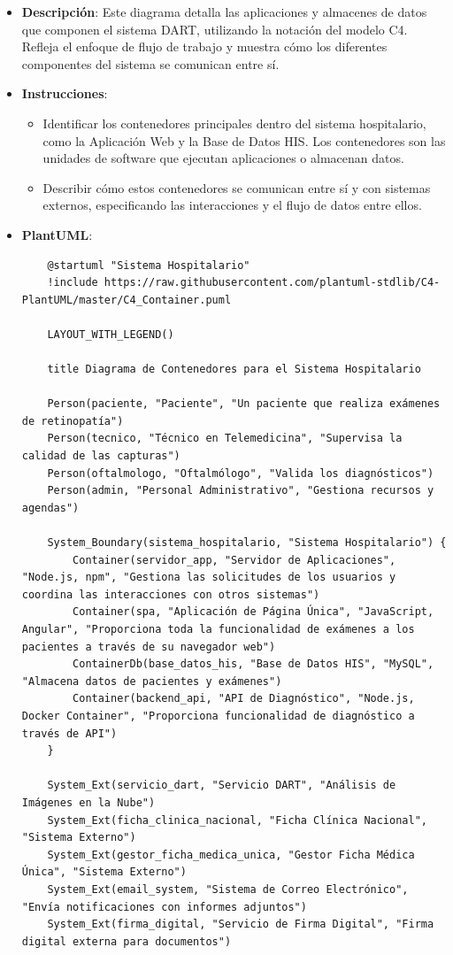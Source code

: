 \begin{itemize}
    \item \textbf{Descripción}: Este diagrama detalla las aplicaciones y almacenes de datos que componen el sistema DART, utilizando la notación del modelo C4. Refleja el enfoque de flujo de trabajo y muestra cómo los diferentes componentes del sistema se comunican entre sí.
    \item \textbf{Instrucciones}:
    \begin{itemize}
        \item Identificar los contenedores principales dentro del sistema hospitalario, como la Aplicación Web y la Base de Datos HIS. Los contenedores son las unidades de software que ejecutan aplicaciones o almacenan datos.
        \item Describir cómo estos contenedores se comunican entre sí y con sistemas externos, especificando las interacciones y el flujo de datos entre ellos.
    \end{itemize}
    \item \textbf{PlantUML}:
    \begin{verbatim}
    @startuml "Sistema Hospitalario"
    !include https://raw.githubusercontent.com/plantuml-stdlib/C4-PlantUML/master/C4_Container.puml

    LAYOUT_WITH_LEGEND()

    title Diagrama de Contenedores para el Sistema Hospitalario

    Person(paciente, "Paciente", "Un paciente que realiza exámenes de retinopatía")
    Person(tecnico, "Técnico en Telemedicina", "Supervisa la calidad de las capturas")
    Person(oftalmologo, "Oftalmólogo", "Valida los diagnósticos")
    Person(admin, "Personal Administrativo", "Gestiona recursos y agendas")

    System_Boundary(sistema_hospitalario, "Sistema Hospitalario") {
        Container(servidor_app, "Servidor de Aplicaciones", "Node.js, npm", "Gestiona las solicitudes de los usuarios y coordina las interacciones con otros sistemas")
        Container(spa, "Aplicación de Página Única", "JavaScript, Angular", "Proporciona toda la funcionalidad de exámenes a los pacientes a través de su navegador web")
        ContainerDb(base_datos_his, "Base de Datos HIS", "MySQL", "Almacena datos de pacientes y exámenes")
        Container(backend_api, "API de Diagnóstico", "Node.js, Docker Container", "Proporciona funcionalidad de diagnóstico a través de API")
    }

    System_Ext(servicio_dart, "Servicio DART", "Análisis de Imágenes en la Nube")
    System_Ext(ficha_clinica_nacional, "Ficha Clínica Nacional", "Sistema Externo")
    System_Ext(gestor_ficha_medica_unica, "Gestor Ficha Médica Única", "Sistema Externo")
    System_Ext(email_system, "Sistema de Correo Electrónico", "Envía notificaciones con informes adjuntos")
    System_Ext(firma_digital, "Servicio de Firma Digital", "Firma digital externa para documentos")


\end{verbatim}
\end{itemize}
